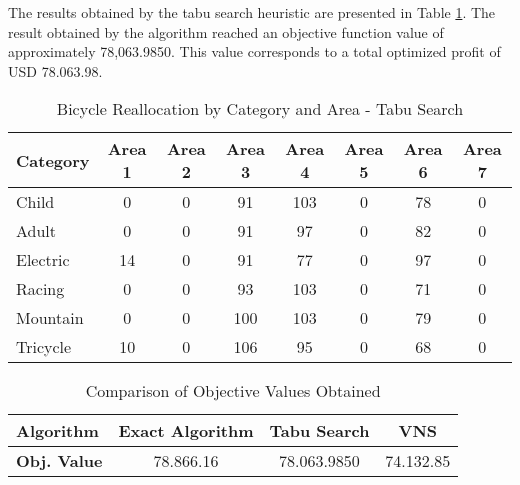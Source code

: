 \documentclass[]{article}
\begin{document}
The results obtained by the tabu search heuristic are presented in Table \ref{tab:resultados-ts}. The result obtained by the algorithm reached an objective function value of approximately 78,063.9850. This value corresponds to a total optimized profit of USD 78.063.98. 


\begin{table}[H]
	\centering
	
	\begin{tabular}{l|ccccccc}
		\hline
		\textbf{Category} & \textbf{Area 1} & \textbf{Area 2} & \textbf{Area 3} & \textbf{Area 4} & \textbf{Area 5} & \textbf{Area 6} & \textbf{Area 7} \\
		\hline
			Child      & 0     & 0     & 91    & 103   & 0     & 78    & 0     \\
			Adult      & 0     & 0     & 91    & 97    & 0     & 82    & 0     \\
			Electric   & 14    & 0     & 91    & 77    & 0     & 97    & 0     \\
			Racing     & 0     & 0     & 93    & 103   & 0     & 71    & 0     \\
			Mountain   & 0     & 0     & 100   & 103   & 0     & 79    & 0     \\
			Tricycle   & 10    & 0     & 106   & 95    & 0     & 68    & 0     \\
		\hline
	\end{tabular}
	\caption{Bicycle Reallocation by Category and Area - Tabu Search}
	\label{tab:resultados-ts}
\end{table}

\begin{table}[htbp]
	\centering
	\begin{tabular}{lccc}
		\hline
		\textbf{Algorithm} & \textbf{Exact Algorithm} & \textbf{Tabu Search} & \textbf{VNS} \\
		\hline
		\textbf{Obj. Value} & 78.866.16 & 78.063.9850 & 74.132.85 \\
		\hline
	\end{tabular}
	\caption{Comparison of Objective Values Obtained}
	\label{tab:transposed_results}
\end{table}
\end{document}
